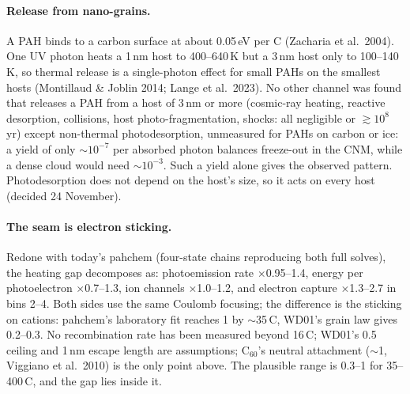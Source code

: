 \documentclass[11pt,a4paper]{article}
\begin{document}
\paragraph{Release from nano-grains.} A PAH binds to a carbon surface at about 0.05\,eV per C (Zacharia et al.\ 2004).
One UV photon heats a 1\,nm host to 400--640\,K but a 3\,nm host only to 100--140\,K, so thermal release is a
single-photon effect for small PAHs on the smallest hosts (Montillaud \& Joblin 2014; Lange et al.\ 2023). No other
channel was found that releases a PAH from a host of 3\,nm or more (cosmic-ray heating, reactive desorption, collisions,
host photo-fragmentation, shocks: all negligible or $\gtrsim10^8$\,yr) except non-thermal photodesorption, unmeasured for
PAHs on carbon or ice: a yield of only $\sim10^{-7}$ per absorbed photon balances freeze-out in the CNM, while a dense
cloud would need $\sim10^{-3}$. Such a yield alone gives the observed pattern. Photodesorption does not depend on the
host's size, so it acts on every host (decided 24 November).

\paragraph{The seam is electron sticking.} Redone with today's pahchem (four-state chains reproducing both full solves),
the heating gap decomposes as: photoemission rate $\times$0.95--1.4, energy per photoelectron $\times$0.7--1.3, ion
channels $\times$1.0--1.2, and electron capture $\times$1.3--2.7 in bins 2--4. Both sides use the same Coulomb focusing;
the difference is the sticking on cations: pahchem's laboratory fit reaches 1 by $\sim$35\,C, WD01's grain law gives
0.2--0.3. No recombination rate has been measured beyond 16\,C; WD01's 0.5 ceiling and 1\,nm escape length are
assumptions; C$_{60}$'s neutral attachment ($\sim$1, Viggiano et al.\ 2010) is the only point above. The plausible range
is 0.3--1 for 35--400\,C, and the gap lies inside it.
\end{document}
